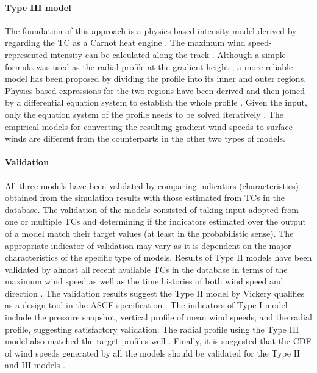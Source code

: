 \paragraph{Type III model} The foundation of this approach is a physics-based intensity model derived by regarding the TC as a Carnot heat engine \citep{emanuel2004tropical,emanuel1988maximum}. The maximum wind speed-represented intensity can be calculated along the track \citep{emanuel2011selfstratification}. Although a simple formula was used as the radial profile at the gradient height \citep{emanuel2006statistical,lin2012hurricane}, a more reliable model has been proposed by dividing the profile into its inner and outer regions. Physics-based expressions for the two regions have been derived and then joined by a differential equation system to establish the whole profile \citep{emanuel2004tropical,emanuel2011selfstratificationa}. Given the input, only the equation system of the profile needs to be solved iteratively \citep{chavas2016model,chavas2015model}. The empirical models for converting the resulting gradient wind speeds to surface winds are different from the counterparts in the other two types of models. 

\paragraph{Validation} All three models have been validated by comparing indicators (characteristics) obtained from the simulation results with those estimated from TCs in the database. The validation of the models consisted of taking input adopted from one or multiple TCs and determining if the indicators estimated over the output of a model match their target values (at least in the probabilistic sense). The appropriate indicator of validation may vary as it is dependent on the major characteristics of the specific type of models. Results of Type II models have been validated by almost all recent available TCs in the database in terms of the maximum wind speed as well as the time histories of both wind speed and direction \citep{li2016typhoona, vickery2000hurricane, vickery2009hurricane-b}. The validation results suggest the Type II model by Vickery qualifies as a design tool in the ASCE specification \citep{vickery2009hurricane-c}. The indicators of Type I model include the pressure snapshot, vertical profile of mean wind speeds, and the radial profile, suggesting satisfactory validation. The radial profile using the Type III model also matched the target profiles well \citep{chavas2015model,emanuel2004tropical,emanuel2006statistical}. Finally, it is suggested that the CDF of wind speeds generated by all the models should be validated for the Type II and III models \cite[e.g.,][]{emanuel2006statistical, li2016typhoon}. 

